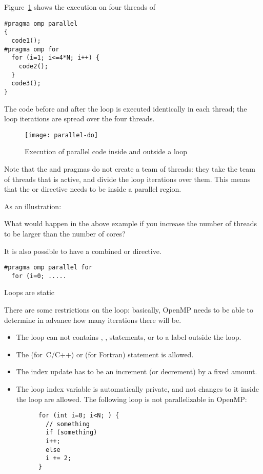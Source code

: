 Figure~\ref{fig:omp-par-do} shows the execution on four threads of
\begin{lstlisting}
#pragma omp parallel
{
  code1();
#pragma omp for
  for (i=1; i<=4*N; i++) {
    code2();
  }
  code3();
}
\end{lstlisting}
The code before and after the loop is executed identically
in each thread; the loop iterations are spread over the four threads.
\begin{figure}[ht]
  \texttt{[image: parallel-do]}
  \caption{Execution of parallel code inside and outside a loop}
  \label{fig:omp-par-do}
\end{figure}

Note that the  and 
pragmas do not create a team of threads: they
take the team of threads that is active,
and divide the loop iterations over them.
This means that the  or  directive needs to be
inside a parallel region.

As an illustration:

\begin{exercise}
  What would happen in the above example if you increase the number of threads
  to be larger than the number of cores?
\end{exercise}

It is also possible to have a combined
 or  directive.
\begin{lstlisting}
#pragma omp parallel for
  for (i=0; .....
\end{lstlisting}

 {Loops are static}

There are some restrictions on the loop: basically, OpenMP needs to be
able to determine in advance how many iterations there will be.
\begin{itemize}
\item The loop can not contains , ,  statements, or
   to a label outside the loop.
\item The  (for~C/C++)
  or  (for Fortran)
  statement is allowed.
\item The index update has to be an increment (or decrement) by a fixed amount.
\item The loop index variable is automatically private, and not changes to it
  inside the loop are allowed.
  The following loop is not parallelizable in OpenMP:
    \begin{lstlisting}
      for (int i=0; i<N; ) {
        // something
        if (something)
        i++;
        else
        i += 2;
      }
    \end{lstlisting}
\end{itemize}

